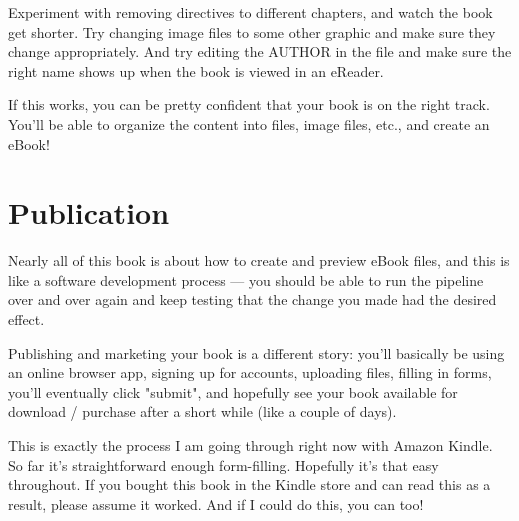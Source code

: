 Experiment with removing directives to  different chapters, and watch the book get shorter. Try changing image files to some other graphic
and make sure they change appropriately. And try editing the AUTHOR in the  file and make sure the right name shows up when the book is viewed in an eReader.

If this works, you can be pretty confident that your book is on the right track. You'll be able to organize the content into \tex files, image files, etc., and create an eBook!


\section{Publication}

Nearly all of this book is about how to create and preview eBook files, and this is like a software development process
--- you should be able to run the pipeline over and over again and keep testing that the change you made had the desired effect.

Publishing and marketing your book is a different story: you'll basically be using an online browser app, signing up for accounts, uploading files, filling in forms,
you'll eventually click "submit", and hopefully see your book available for download / purchase after a short while (like a couple of days).

This is exactly the process I am going through right now with Amazon Kindle. So far it's straightforward enough form-filling. Hopefully it's that easy throughout.
If you bought this book in the Kindle store and can read this as a result, please assume it worked. And if I could do this, you can too!





